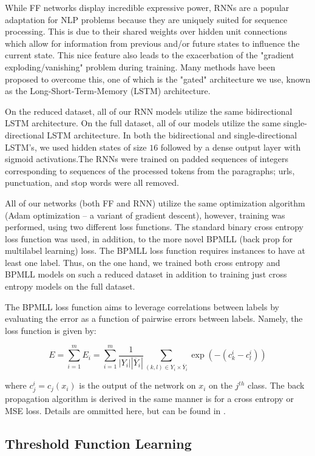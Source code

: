 \documentclass[11pt]{article}
\begin{document}
While FF networks display incredible expressive power, RNNs are a popular adaptation for NLP problems because they are uniquely suited for sequence processing. This is due to their shared weights over hidden unit connections which allow for information from previous and/or future states to influence the current state. This nice feature also leads to the exacerbation of the "gradient exploding/vanishing" problem during training. Many methods have been proposed to overcome this, one of which is the "gated" architecture we use, known as the Long-Short-Term-Memory (LSTM) architecture. 

On the reduced dataset, all of our RNN models utilize the same bidirectional LSTM architecture. On the full dataset, all of our models utilize the same single-directional LSTM architecture. In both the bidirectional and single-directional LSTM's, we used hidden states of size $16$ followed by a dense output layer with sigmoid activations.The RNNs were trained on padded sequences of integers corresponding to sequences of the processed tokens from the paragraphs; urls, punctuation, and stop words were all removed. 

All of our networks (both FF and RNN) utilize the same optimization algorithm (Adam optimization -- a variant of gradient descent), however, training was performed, using two different loss functions. The standard binary cross entropy loss function was used, in addition, to the more novel BPMLL (back prop for multilabel learning) loss. The BPMLL loss function requires instances to have at least one label. Thus, on the one hand, we trained both cross entropy and BPMLL models on such a reduced dataset in addition to training just cross entropy models on the full dataset. 

The BPMLL loss function aims to leverage correlations between labels by evaluating the error as a function of pairwise errors between labels. Namely, the loss function is given by:

$$
    E = \sum_{i = 1}^m E_i = \sum_{i = 1}^m \frac{1}{|Y_i| |\overline{Y}_i|} \sum_{(k,l) \in Y_i \times \overline{Y}_i} \exp(-(c_k^i - c_l^i))
$$

where $c_j^i = c_j(x_i)$ is the output of the network on $x_i$ on the $j^{th}$ class. The back propagation algorithm is derived in the same manner is for a cross entropy or MSE loss. Details are ommitted here, but can be found in \autocite{bpmll}.
  
\subsection{Threshold Function Learning}
\end{document}
